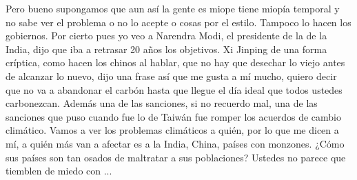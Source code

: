 Pero bueno supongamos que aun así la gente es miope tiene miopía temporal y no sabe ver el problema o no lo acepte o cosas por el estilo. Tampoco lo hacen los gobiernos. Por cierto pues yo veo a Narendra Modi, el presidente de la de la India, dijo que iba a retrasar 20 años los objetivos. Xi Jinping de una forma críptica, como hacen los chinos al hablar, que no hay que desechar lo viejo antes de alcanzar lo nuevo, dijo una frase así que me gusta a mí mucho, quiero decir que no va a abandonar el carbón hasta que llegue el día ideal que todos ustedes carbonezcan. Además una de las sanciones, si no recuerdo mal, una de las sanciones que puso cuando fue lo de Taiwán fue romper los acuerdos de cambio climático. Vamos a ver los problemas climáticos a quién, por lo que me dicen a mí, a quién más van a afectar es a la India, China, países con monzones. ¿Cómo sus países son tan osados de maltratar a sus poblaciones? Ustedes no parece que tiemblen de miedo con ... 

